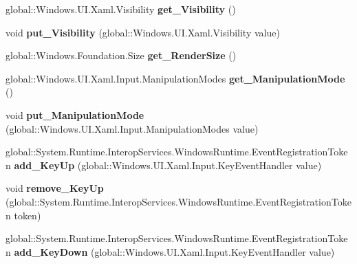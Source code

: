 \begin{DoxyCompactItemize}
global\+::\+Windows.\+U\+I.\+Xaml.\+Visibility {\bfseries get\+\_\+\+Visibility} ()
\item 
\mbox{\label{interface_windows_1_1_u_i_1_1_xaml_1_1_i_u_i_element_aad5d9c40429e519a8d16db9da184a42b}} 
void {\bfseries put\+\_\+\+Visibility} (global\+::\+Windows.\+U\+I.\+Xaml.\+Visibility value)
\item 
\mbox{\label{interface_windows_1_1_u_i_1_1_xaml_1_1_i_u_i_element_a436b4b809e5f92e434326f446a1b3fb0}} 
global\+::\+Windows.\+Foundation.\+Size {\bfseries get\+\_\+\+Render\+Size} ()
\item 
\mbox{\label{interface_windows_1_1_u_i_1_1_xaml_1_1_i_u_i_element_ac7efa9d3bcb66e3a95621d9e942b339d}} 
global\+::\+Windows.\+U\+I.\+Xaml.\+Input.\+Manipulation\+Modes {\bfseries get\+\_\+\+Manipulation\+Mode} ()
\item 
\mbox{\label{interface_windows_1_1_u_i_1_1_xaml_1_1_i_u_i_element_ae026809f65653a37cd75df9589dc5e90}} 
void {\bfseries put\+\_\+\+Manipulation\+Mode} (global\+::\+Windows.\+U\+I.\+Xaml.\+Input.\+Manipulation\+Modes value)
\item 
\mbox{\label{interface_windows_1_1_u_i_1_1_xaml_1_1_i_u_i_element_abae2e6510442e3bf03b0abd24270a3e7}} 
global\+::\+System.\+Runtime.\+Interop\+Services.\+Windows\+Runtime.\+Event\+Registration\+Token {\bfseries add\+\_\+\+Key\+Up} (global\+::\+Windows.\+U\+I.\+Xaml.\+Input.\+Key\+Event\+Handler value)
\item 
\mbox{\label{interface_windows_1_1_u_i_1_1_xaml_1_1_i_u_i_element_a5d62f2ed59084c31013a2397faab0314}} 
void {\bfseries remove\+\_\+\+Key\+Up} (global\+::\+System.\+Runtime.\+Interop\+Services.\+Windows\+Runtime.\+Event\+Registration\+Token token)
\item 
\mbox{\label{interface_windows_1_1_u_i_1_1_xaml_1_1_i_u_i_element_a06c59188c0e071badb5405f835fbedd1}} 
global\+::\+System.\+Runtime.\+Interop\+Services.\+Windows\+Runtime.\+Event\+Registration\+Token {\bfseries add\+\_\+\+Key\+Down} (global\+::\+Windows.\+U\+I.\+Xaml.\+Input.\+Key\+Event\+Handler value)

\end{DoxyCompactItemize}
